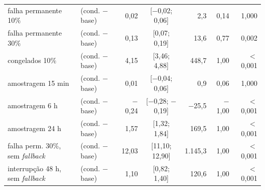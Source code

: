\begin{tabular}{@{}llrcrrr@{}}
falha permanente 10\% & \polD{} (cond. $-$ base) & 0,02 & [$-$0,02; 0,06] & 2,3 & 0,14 & 1,000 \\
falha permanente 30\% & \polD{} (cond. $-$ base) & 0,13 & [0,07; 0,19] & 13,6 & 0,77 & 0,002 \\
congelados 10\% & \polD{} (cond. $-$ base) & 4,15 & [3,46; 4,88] & 448,7 & 1,00 & $<$0,001 \\
amostragem 15 min & \polD{} (cond. $-$ base) & 0,01 & [$-$0,04; 0,06] & 0,9 & 0,06 & 1,000 \\
amostragem 6 h & \polD{} (cond. $-$ base) & $-$0,24 & [$-$0,28; $-$0,19] & $-$25,5 & $-$1,00 & $<$0,001 \\
amostragem 24 h & \polD{} (cond. $-$ base) & 1,57 & [1,32; 1,84] & 169,5 & 1,00 & $<$0,001 \\
falha perm. 30\%, sem \emph{fallback} & \polD{} (cond. $-$ base) & 12,03 & [11,10; 12,90] & 1.145,3 & 1,00 & $<$0,001 \\
interrupção 48 h, sem \emph{fallback} & \polD{} (cond. $-$ base) & 1,10 & [0,82; 1,40] & 120,6 & 1,00 & $<$0,001 \\
\bottomrule
\end{tabular}
